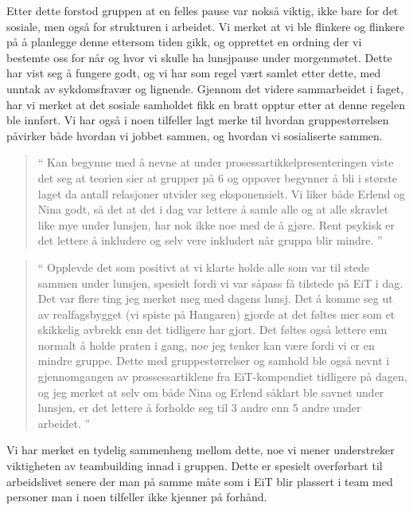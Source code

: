 Etter dette forstod gruppen at en felles pause var nokså viktig, ikke bare for det sosiale, men også for strukturen i arbeidet. Vi merket at vi ble flinkere og flinkere på å planlegge denne ettersom tiden gikk, og opprettet en ordning der vi bestemte oss for når og hvor vi skulle ha lunsjpause under morgenmøtet. Dette har vist seg å fungere godt, og vi har som regel vært samlet etter dette, med unntak av sykdomsfravær og lignende. Gjennom det videre sammarbeidet i faget, har vi merket at det sosiale samholdet fikk en bratt opptur etter at denne regelen ble innført. Vi har også i noen tilfeller lagt merke til hvordan gruppestørrelsen påvirker både hvordan vi jobbet sammen, og hvordan vi sosialiserte sammen. 

\begin{quote}``
Kan begynne med å nevne at under prosessartikkelpresenteringen viste det seg at teorien sier at grupper på 6 og oppover begynner å bli i største laget da antall relasjoner utvider seg eksponensielt. Vi liker både Erlend og Nina godt, så det at det i dag var lettere å samle alle og at alle skravlet like mye under lunsjen, har nok ikke noe med de å gjøre. Rent psykisk er det lettere å inkludere og selv vere inkludert når gruppa blir mindre.
''\end{quote} 

\begin{quote}``
Opplevde det som positivt at vi klarte holde alle som var til stede sammen under lunsjen, spesielt fordi vi var såpass få tilstede på EiT i dag. Det var flere ting jeg merket meg med dagens lunsj. Det å komme seg ut av realfagsbygget (vi spiste på Hangaren) gjorde at det føltes mer som et skikkelig avbrekk enn det tidligere har gjort. Det føltes også lettere enn normalt å holde praten i gang, noe jeg tenker kan være fordi vi er en mindre gruppe. Dette med gruppestørrelser og samhold ble også nevnt i gjennomgangen av prossessartiklene fra EiT-kompendiet tidligere på dagen, og jeg merket at selv om både Nina og Erlend såklart ble savnet under lunsjen, er det lettere å forholde seg til 3 andre enn 5 andre under arbeidet.
''\end{quote} 

Vi har merket en tydelig sammenheng mellom dette, noe vi mener understreker viktigheten av teambuilding innad i gruppen. Dette er spesielt overførbart til arbeidslivet senere der man på samme måte som i EiT blir plassert i team med personer man i noen tilfeller ikke kjenner på forhånd.

